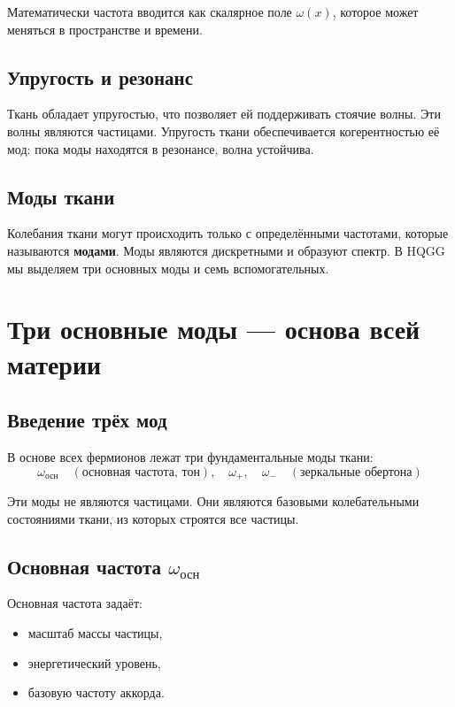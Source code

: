 \documentclass[12pt,a4paper]{article}
\begin{document}
Математически частота вводится как скалярное поле \(\omega(x)\), которое может меняться в пространстве и времени.

\subsection{Упругость и резонанс}

Ткань обладает упругостью, что позволяет ей поддерживать стоячие волны. Эти волны являются частицами. Упругость ткани обеспечивается когерентностью её мод: пока моды находятся в резонансе, волна устойчива.

\subsection{Моды ткани}

Колебания ткани могут происходить только с определёнными частотами, которые называются \textbf{модами}. Моды являются дискретными и образуют спектр. В HQGG мы выделяем три основных моды и семь вспомогательных.

\section{Три основные моды — основа всей материи}

\subsection{Введение трёх мод}

В основе всех фермионов лежат три фундаментальные моды ткани:
\[
\omega_{\text{осн}} \quad (\text{основная частота, тон}), \quad \omega_{+}, \quad \omega_{-} \quad (\text{зеркальные обертона})
\]

Эти моды не являются частицами. Они являются базовыми колебательными состояниями ткани, из которых строятся все частицы.

\subsection{Основная частота \( \omega_{\text{осн}} \)}

Основная частота задаёт:
\begin{itemize}
\item масштаб массы частицы,
\item энергетический уровень,
\item базовую частоту аккорда.
\end{itemize}
\end{document}
